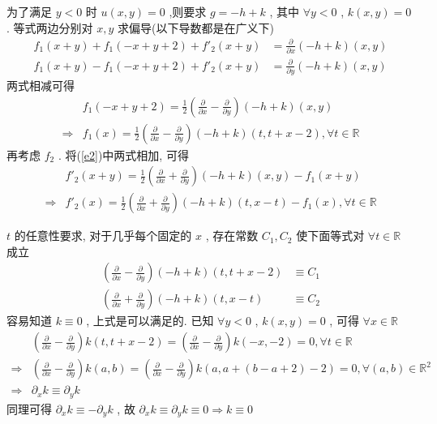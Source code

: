 \documentclass[a4paper, UTF8]{ctexart}				%
\begin{document}
        为了满足 $y<0$ 时 $u(x,y) = 0$ ,则要求 $g = -h + k$ , 其中 $\forall y < 0$ , $k(x,y) = 0$ . 等式两边分别对 $x, y$ 求偏导(以下导数都是在广义下)
        \begin{equation}\label{e2}
            \begin{split}
                f_1(x+y) + f_1(-x+y+2) + f'_2(x+y) & = \frac{\partial}{\partial x}(-h + k)(x,y)\\
                f_1(x+y) - f_1(-x+y+2) + f'_2(x+y) & = \frac{\partial}{\partial y}(-h + k)(x,y)
            \end{split}
        \end{equation}
        两式相减可得 
        \[
            \begin{split}
                & f_1(-x+y+2) = \frac{1}{2}(\frac{\partial}{\partial x} - \frac{\partial}{\partial y})(-h + k)(x,y)\\
                \Rightarrow & f_1(x) = \frac{1}{2}(\frac{\partial}{\partial x} - \frac{\partial}{\partial y})(-h + k)(t, t+x-2) , \forall t \in \mathbb{R}
            \end{split}
        \]
        再考虑 $f_2$ . 将(\ref{e2})中两式相加, 可得 
        \[
            \begin{split}
                & f'_2(x+y) = \frac{1}{2} (\frac{\partial}{\partial x} + \frac{\partial}{\partial y})(-h + k)(x, y) - f_1(x+y)\\
                \Rightarrow & f'_2(x) = \frac{1}{2} (\frac{\partial}{\partial x} + \frac{\partial}{\partial y})(-h + k)(t, x-t) - f_1(x) , \forall t \in \mathbb{R}
            \end{split}
        \]
        
        $t$ 的任意性要求, 对于几乎每个固定的 $x$ , 存在常数 $C_1,C_2$ 使下面等式对 $\forall t \in \mathbb{R}$ 成立
        \[
            \begin{split}
                (\frac{\partial}{\partial x} - \frac{\partial}{\partial y})(-h + k)(t, t+x-2) & \equiv C_1\\
                (\frac{\partial}{\partial x} + \frac{\partial}{\partial y})(-h + k)(t, x-t) & \equiv C_2
            \end{split}
        \]
        容易知道 $k \equiv 0$ , 上式是可以满足的. 已知 $\forall y < 0$ , $k(x,y) = 0$ , 可得 $\forall x \in \mathbb{R}$ 
        \[
            \begin{split}
                & (\frac{\partial}{\partial x} - \frac{\partial}{\partial y})k(t, t+x-2) = (\frac{\partial}{\partial x} - \frac{\partial}{\partial y})k(-x, -2) = 0 , \forall t \in \mathbb{R}\\
                \Rightarrow & (\frac{\partial}{\partial x} - \frac{\partial}{\partial y})k(a, b) = (\frac{\partial}{\partial x} - \frac{\partial}{\partial y})k(a, a+(b-a+2)-2) = 0 , \forall (a,b) \in \mathbb{R}^2\\
                \Rightarrow & \partial_x k \equiv \partial_y k
            \end{split}
        \]
        同理可得 $\partial_x k \equiv -\partial_y k$ , 故 $\partial_x k \equiv \partial_y k \equiv 0 \Rightarrow k \equiv 0$
\end{document}
